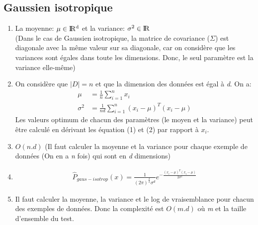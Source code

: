 \documentclass{article}
\begin{document}
\subsection{Gaussien isotropique}
\begin{enumerate}[label=(\alph*)]
\item La moyenne: $\mu \in \rm I\!R^d $ et la variance: $\sigma ^2 \in
  \rm I\!R $ \\
  (Dans le cas de Gaussien isotropique, la matrice de
  covariance ($\Sigma$) est diagonale avec la même valeur sur sa
  diagonale, car on considère que les variances sont égales dans
  toute les dimensions. Donc, le seul paramètre est la variance
  elle-même)
\item
  On considère que $\lvert D  \rvert = n$ et que la dimension des
  données est égal à \emph{d}. On a:
  \begin{align}
    \mu &= \frac{1}{n} \sum_{i=1}^{n} x_i \\
    \sigma ^2 &= \frac{1}{nd} \sum_{i=1}^{n} (x_i - \mu)^T(x_i - \mu)
  \end{align}
  Les valeurs optimum de chacun des paramètres (le moyen et la
  variance) peut être calculé en dérivant les équation (1) et (2)
  par rapport à $x_i$.
\item $O(n.d)$ (Il faut calculer la moyenne et la variance pour
  chaque exemple de données (On en a \emph{n} fois) qui sont en
  \emph{d} dimensions)
\item
  \begin{align*}
    \hat{P}_{gaus-isotrop}(x) = \frac{1}{(2 \pi)^\frac{d}{2} \sigma
    ^d}e^{-\frac{(x_i - \mu)^T(x_i - \mu)}{2\sigma ^2}}
  \end{align*}

\item Il faut calculer la moyenne, la variance et le log de
  vraisemblance pour chacun des exemples de données. Donc la
  complexité est  $O(m.d)$ où \emph{m} et la taille d'ensemble du test.
\end{enumerate}
\end{document}
